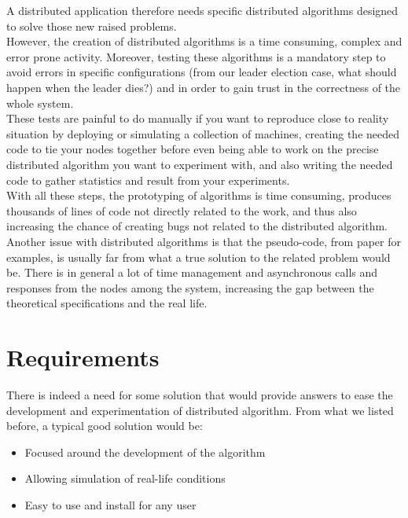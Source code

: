\documentclass{eplmastersthesis}
\begin{document}
      A distributed application therefore needs specific distributed algorithms
      designed to solve those new raised problems.\\

      However, the creation of distributed algorithms is a time consuming,
      complex and error prone activity. Moreover, testing these algorithms is
      a mandatory step to avoid errors in specific configurations (from our
      leader election case, what should happen when the leader dies?) and in
      order to gain trust in the correctness of the whole system.\\
      These tests are painful to do manually if you want to reproduce close
      to reality situation by deploying or simulating a collection of machines,
      creating the needed code to tie your nodes together before even being
      able to work on the precise distributed algorithm you want to experiment
      with, and also writing the needed code to gather statistics and result
      from your experiments.\\
      With all these steps, the prototyping of algorithms is time consuming,
      produces thousands of lines of code not directly related to the work,
      and thus also increasing the chance of creating bugs not related to the
      distributed algorithm.\\

      Another issue with distributed algorithms is that the pseudo-code,
      from paper for examples, is usually far from what a true solution to the
      related problem would be. There is in general a lot of time management
      and asynchronous calls and responses from the nodes among the system,
      increasing the gap between the theoretical specifications and the real
      life.

    \section{Requirements}

      There is indeed a need for some solution that would provide answers
      to ease the development and experimentation of distributed algorithm.
      From what we listed before, a typical good solution would be:

      \begin{itemize}
        \item Focused around the development of the algorithm
        \item Allowing simulation of real-life conditions
        \item Easy to use and install for any user
      \end{itemize}
\end{document}
